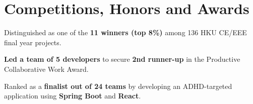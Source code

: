 \documentclass[a4paper,10pt]{article}
\begin{document}
\begin{spacedtabular*}{\linewidth}




\end{spacedtabular*}

\section{Competitions, Honors and Awards}

\begin{tightitemize}
  \item Distinguished as one of the \textbf{11 winners (top 8\%)} among 136 HKU CE/EEE final year projects.
\end{tightitemize}

\begin{tightitemize}
  \item \textbf{Led a team of 5 developers} to secure \textbf{2nd runner-up} in the Productive Collaborative Work Award.
  \item Ranked as a \textbf{finalist out of 24 teams} by developing an ADHD-targeted application using \textbf{Spring Boot} and \textbf{React}.
\end{tightitemize}


\newcommand{\dvd}[0]{\hspace{3pt}\vrule\hspace{3pt}}
\end{document}
